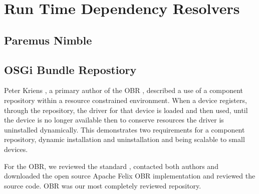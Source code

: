 \section{Run Time Dependency Resolvers}
\subsection{Paremus Nimble}

\subsection{OSGi Bundle Repostiory}
Peter Kriens \cite{kriens_osgi_2008}, 
a primary author of the OBR \cite{the_osgi_alliance_rfc-0112_2006}, described a use of a component repository within a resource constrained environment.
When a device registers, 
through the repository, the driver for that device is loaded and then used, until the device is no longer available
then to conserve resources the driver is uninstalled dynamically. 
This demonstrates two requirements for a component repository, dynamic installation and uninstallation and being scalable to small devices.

For the OBR, we reviewed the standard \cite{the_osgi_alliance_rfc-0112_2006}, 
contacted both authors \cite{kriens_osgi_2008, richard_s._hall_obr_2008} 
and downloaded the open source Apache Felix OBR implementation and reviewed the source code.
OBR was our most completely reviewed repository.


